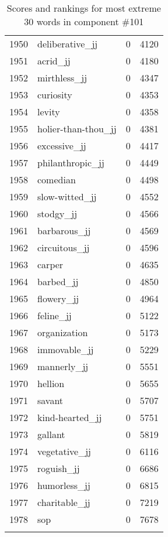 \begin{longtable}[!htbp]{| rlr@{.}l |}
    1950 & deliberative\_jj & 0 & 4120 \\
    1951 & acrid\_jj & 0 & 4180 \\
    1952 & mirthless\_jj & 0 & 4347 \\
    1953 & curiosity & 0 & 4353 \\
    1954 & levity & 0 & 4358 \\
    1955 & holier-than-thou\_jj & 0 & 4381 \\
    1956 & excessive\_jj & 0 & 4417 \\
    1957 & philanthropic\_jj & 0 & 4449 \\
    1958 & comedian & 0 & 4498 \\
    1959 & slow-witted\_jj & 0 & 4552 \\
    1960 & stodgy\_jj & 0 & 4566 \\
    1961 & barbarous\_jj & 0 & 4569 \\
    1962 & circuitous\_jj & 0 & 4596 \\
    1963 & carper & 0 & 4635 \\
    1964 & barbed\_jj & 0 & 4850 \\
    1965 & flowery\_jj & 0 & 4964 \\
    1966 & feline\_jj & 0 & 5122 \\
    1967 & organization & 0 & 5173 \\
    1968 & immovable\_jj & 0 & 5229 \\
    1969 & mannerly\_jj & 0 & 5551 \\
    1970 & hellion & 0 & 5655 \\
    1971 & savant & 0 & 5707 \\
    1972 & kind-hearted\_jj & 0 & 5751 \\
    1973 & gallant & 0 & 5819 \\
    1974 & vegetative\_jj & 0 & 6116 \\
    1975 & roguish\_jj & 0 & 6686 \\
    1976 & humorless\_jj & 0 & 6815 \\
    1977 & charitable\_jj & 0 & 7219 \\
    1978 & sop & 0 & 7678 \\
    \hline
    \caption{Scores and rankings for most extreme 30 words in component \#101} \\
\end{longtable}
